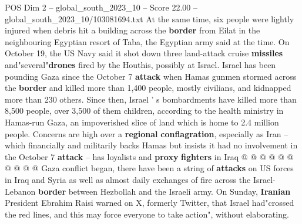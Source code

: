 \begin{textsample}{POS Dim 2 – global\_south\_2023\_10 – Score 22.00 – global\_south\_2023\_10/103081694.txt}
At the same time, six people were lightly injured when debris hit a building across the \textbf{border} from Eilat in the neighbouring Egyptian resort of Taba, the Egyptian army said at the time.
On October 19, the US Navy said it shot down three land-attack cruise \textbf{missiles} and"several"\textbf{drones} fired by the Houthis, possibly at Israel.
Israel has been pounding Gaza since the October 7 \textbf{attack} when Hamas gunmen stormed across the \textbf{border} and killed more than 1,400 people, mostly civilians, and kidnapped more than 230 others.
Since then, Israel ' s bombardments have killed more than 8,500 people, over 3,500 of them children, according to the health ministry in Hamas-run Gaza, an impoverished slice of land which is home to 2.4 million people.
Concerns are high over a \textbf{regional} \textbf{conflagration}, especially as Iran -- which financially and militarily backs Hamas but insists it had no involvement in the October 7 \textbf{attack} -- has loyalists and \textbf{proxy} \textbf{fighters} in Iraq @ @ @ @ @ @ @ @ @ @ Gaza conflict began, there have been a string of \textbf{attacks} on US forces in Iraq and Syria as well as almost daily exchanges of fire across the Israel-Lebanon \textbf{border} between Hezbollah and the Israeli army.
On Sunday, \textbf{Iranian} President Ebrahim Raisi warned on X, formerly Twitter, that Israel had"crossed the red lines, and this may force everyone to take action", without elaborating.

\end{textsample}
